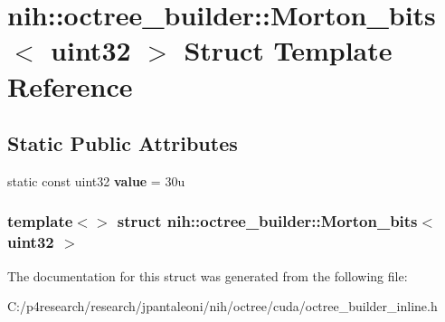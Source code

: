 \hypertarget{structnih_1_1octree__builder_1_1_morton__bits_3_01uint32_01_4}{
\section{nih\-:\-:octree\-\_\-builder\-:\-:\-Morton\-\_\-bits$<$ uint32 $>$ \-Struct \-Template \-Reference}
\label{structnih_1_1octree__builder_1_1_morton__bits_3_01uint32_01_4}
}
\subsection*{\-Static \-Public \-Attributes}
\begin{DoxyCompactItemize}
\item 
\hypertarget{structnih_1_1octree__builder_1_1_morton__bits_3_01uint32_01_4_a29fd65c0435546feb53edc0654d7bc4a}{
static const uint32 {\bfseries value} = 30u}
\label{structnih_1_1octree__builder_1_1_morton__bits_3_01uint32_01_4_a29fd65c0435546feb53edc0654d7bc4a}

\end{DoxyCompactItemize}
\subsubsection*{template$<$$>$ struct nih\-::octree\-\_\-builder\-::\-Morton\-\_\-bits$<$ uint32 $>$}



\-The documentation for this struct was generated from the following file\-:\begin{DoxyCompactItemize}
\item 
\-C\-:/p4research/research/jpantaleoni/nih/octree/cuda/octree\-\_\-builder\-\_\-inline.\-h\end{DoxyCompactItemize}
